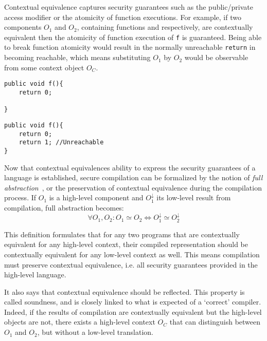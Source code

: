 \documentclass[11pt]{article}
\newcommand{\com}[1]{#1^\downarrow}
\begin{document}
Contextual equivalence captures security guarantees such as the public/private access modifier or the atomicity of function executions. For example, if two components $O_1$ and $O_2$, containing functions  and  respectively, are contextually equivalent then the atomicity of function execution of \lstinline{f} is guaranteed. Being able to break function atomicity would result in the normally unreachable \lstinline{return} in  becoming reachable, which means substituting $O_1$ by $O_2$ would be observable from some context object $O_C$.

\begin{minipage}{0.40\textwidth}
\begin{lstlisting}[label={lst:SimpleReturn}, caption={Simple return}]
public void f(){
    return 0;
    
}
\end{lstlisting}
\end{minipage}
\begin{minipage}{0.40\textwidth}
\begin{lstlisting}[label={lst:UnreachableCode}, caption={Unreachable code}]
public void f(){
    return 0; 
    return 1; //Unreachable
}
\end{lstlisting}
\end{minipage}

Now that contextual equivalences ability to express the security guarantees of a language is established, secure compilation can be formalized by the notion of \emph{full abstraction}~\cite{Abadi}, or the preservation of contextual equivalence during the compilation process.
If $O_1$ is a high-level component and $\com{O_1}$ its low-level result from compilation, full abstraction becomes:
\[
 \forall O_1, O_2 : O_1 \simeq O_2 \iff \com{O_1} \simeq \com{O_2}
\]

This definition formulates that for any two programs that are contextually equivalent for any high-level context, their compiled representation should be contextually equivalent for any low-level context as well. 
This means compilation must preserve contextual equivalence, i.e. all security guarantees provided in the high-level language.

It also says that contextual equivalence should be reflected.
This property is called soundness, and is closely linked to what is expected of a `correct' compiler.
Indeed, if the results of compilation are contextually equivalent but the high-level objects are not, there exists a high-level context $O_C$ that can distinguish between $O_1$ and $O_2$, but without a low-level translation.
\end{document}
